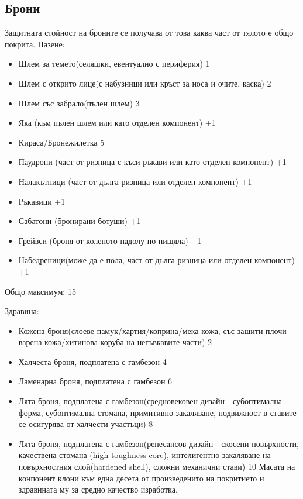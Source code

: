\subsection{Брони}
Защитната стойност на броните се получава от това каква част от тялото е общо покрита.
Пазене:
\begin{itemize}
\item{Шлем за темето(селяшки, евентуално с периферия) 1}
\item{Шлем с открито лице(с набузници или кръст за носа и очите, каска) 2}
\item{Шлем със забрало(пълен шлем) 3}
\item{Яка (към пълен шлем или като отделен компонент) +1}

\item{Кираса/Бронежилетка 5}

\item{Паудрони (част от ризница с къси ръкави или като отделен компонент) +1}
\item{Налакътници (част от дълга ризница или отделен компонент) +1}
\item{Ръкавици +1}

\item{Сабатони (бронирани ботуши) +1}
\item{Грейвси (броня от коленото надолу по пищяла) +1}
\item{Набедреници(може да е пола, част от дълга ризница или отделен компонент) +1}
\end{itemize}

Общо максимум: 15

Здравина:
\begin{itemize}
\item{Кожена броня(слоеве памук/хартия/коприна/мека кожа, със зашити плочи варена кожа/хитинова коруба на негъвкавите части) 2}
\item{Халчеста броня, подплатена с гамбезон 4}
\item{Ламенарна броня, подплатена с гамбезон 6}
\item{Лята броня, подплатена с гамбезон(средновековен дизайн - субоптимална форма, субоптимална стомана, примитивно закаляване, подвижност в ставите се осигурява от халчести участъци) 8}
\item{Лята броня, подплатена с гамбезон(ренесансов дизайн - скосени повърхности, качествена стомана (high toughness core),  интелигентно закаляване на повърхностния слой(hardened shell), сложни механични стави) 10}
Масата на конпонент клони към една десета от произведенито на покритието и здравината му за средно качество изработка.
\end{itemize}


